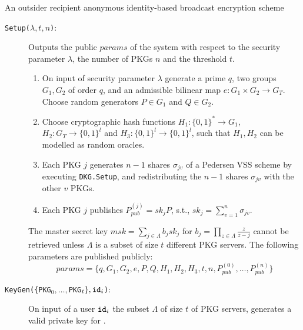 \begin{algorithm}[H]
\caption{An outsider recipient anonymous identity-based broadcast encryption scheme}
\label{alg:our_scheme}

\begin{description}
    \item[\texttt{Setup($\lambda, t, n$)}:] Outputs the public $params$ of the system with respect to the security parameter $\lambda$, the number of PKGs $n$ and the threshold $t$.
    \begin{enumerate}
        \item On input of security parameter $\lambda$ generate a prime $q$, two groups $G_1, G_2$ of order $q$, and an admissible bilinear map $e: G_1 \times G_2 \rightarrow G_T$. Choose random generators $P \in G_1$ and $Q \in G_2$. 
    
        \item Choose cryptographic hash functions $H_1: \{ 0,1 \}^{*} \rightarrow G_1$, ${H_2: G_T \rightarrow \{ 0,1 \}^{l}}$ and $H_3: \{ 0, 1 \}^{l} \rightarrow \{ 0,1 \}^{l}$, such that $H_1, H_2$ can be modelled as random oracles.
        
        \item Each PKG $j$ generates $n-1$ shares $\sigma_{jv}$ of a Pedersen VSS scheme by executing \texttt{DKG.Setup}, and redistributing the $n-1$ shares $\sigma_{jv}$ with the other $v$ PKGs.

        \item Each PKG $j$ publishes $P_{pub}^{(j)} = sk_j P$, s.t., $sk_j=\sum_{v=1}^n \sigma_{jv}$.
    \end{enumerate}
    
    The master secret key $msk = \sum_{j \in \Lambda} b_j sk_j$ for $b_j = \prod_{z \in \Lambda} \frac{z}{z-j}$ cannot be retrieved unless $\Lambda$ is a subset of size $t$ different PKG servers. The following parameters are published publicly:
    \begin{equation*}
    params = \{ q, G_1, G_2, e, P, Q, H_1, H_2, H_3, t, n, P_{pub}^{(0)}, \ldots, P_{pub}^{(n)} \}
    \end{equation*}

    \item[\texttt{KeyGen(\{PKG$_0,\ldots,$PKG$_t\}, \mathtt{id}_{i}$)}:] On input of a user $\mathtt{id}_{i}$ the subset $\Lambda$ of size $t$ of PKG servers, generates a valid private key for . 
    

\end{description}
\end{algorithm}
